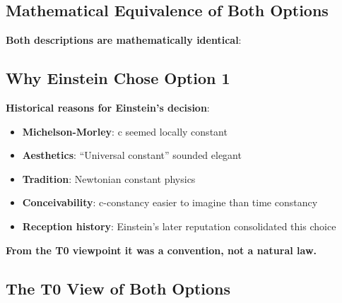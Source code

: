 	\subsection{Mathematical Equivalence of Both Options}
	
	\textbf{Both descriptions are mathematically identical}:
	
	\begin{table}[htbp]
		\centering
		\caption{Two views, identical physics}
	\end{table}
	
	\subsection{Why Einstein Chose Option 1}
	
	\textbf{Historical reasons for Einstein's decision}:
	\begin{itemize}
		\item \textbf{Michelson-Morley}: c seemed locally constant
		\item \textbf{Aesthetics}: ``Universal constant'' sounded elegant
		\item \textbf{Tradition}: Newtonian constant physics
		\item \textbf{Conceivability}: c-constancy easier to imagine than time constancy
		\item \textbf{Reception history}: Einstein's later reputation consolidated this choice
	\end{itemize}
	
	\textbf{From the T0 viewpoint it was a convention, not a natural law.}
	
	\subsection{The T0 View of Both Options}
	
